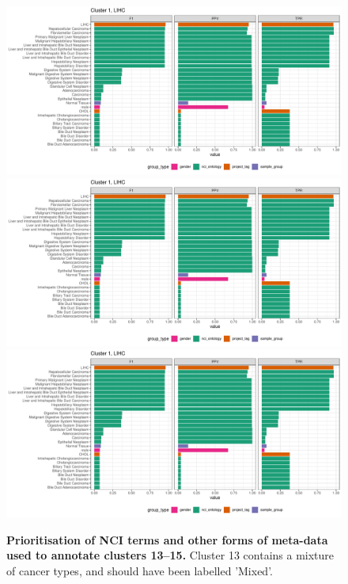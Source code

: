 \begin{figure}[H]
	\centering
	\includegraphics[width=.95\linewidth,page=13]{fig/tcga/cluster_labelling.pdf}
	\includegraphics[width=.95\linewidth,page=14]{fig/tcga/cluster_labelling.pdf}
	\includegraphics[width=.95\linewidth,page=15]{fig/tcga/cluster_labelling.pdf}
	\caption{
		\textbf{Prioritisation of NCI terms and other forms of meta-data used to annotate clusters 13--15.} 
		Cluster 13 contains a mixture of cancer types, and should have been labelled 'Mixed'.
	}
	\label{fig:cluslab5}
\end{figure}


